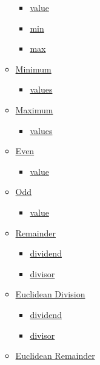 \begin{itemize}
\begin{itemize}
    \begin{itemize}
    \tightlist
    \item
      \hyperref[functions-clamp-value]{value}
    \item
      \hyperref[functions-clamp-min]{min}
    \item
      \hyperref[functions-clamp-max]{max}
    \end{itemize}
  \item
    \hyperref[functions-min]{Minimum}

    \begin{itemize}
    \tightlist
    \item
      \hyperref[functions-min-values]{values}
    \end{itemize}
  \item
    \hyperref[functions-max]{Maximum}

    \begin{itemize}
    \tightlist
    \item
      \hyperref[functions-max-values]{values}
    \end{itemize}
  \item
    \hyperref[functions-even]{Even}

    \begin{itemize}
    \tightlist
    \item
      \hyperref[functions-even-value]{value}
    \end{itemize}
  \item
    \hyperref[functions-odd]{Odd}

    \begin{itemize}
    \tightlist
    \item
      \hyperref[functions-odd-value]{value}
    \end{itemize}
  \item
    \hyperref[functions-rem]{Remainder}

    \begin{itemize}
    \tightlist
    \item
      \hyperref[functions-rem-dividend]{dividend}
    \item
      \hyperref[functions-rem-divisor]{divisor}
    \end{itemize}
  \item
    \hyperref[functions-div-euclid]{Euclidean Division}

    \begin{itemize}
    \tightlist
    \item
      \hyperref[functions-div-euclid-dividend]{dividend}
    \item
      \hyperref[functions-div-euclid-divisor]{divisor}
    \end{itemize}
  \item
    \hyperref[functions-rem-euclid]{Euclidean Remainder}


\end{itemize}
\end{itemize}
